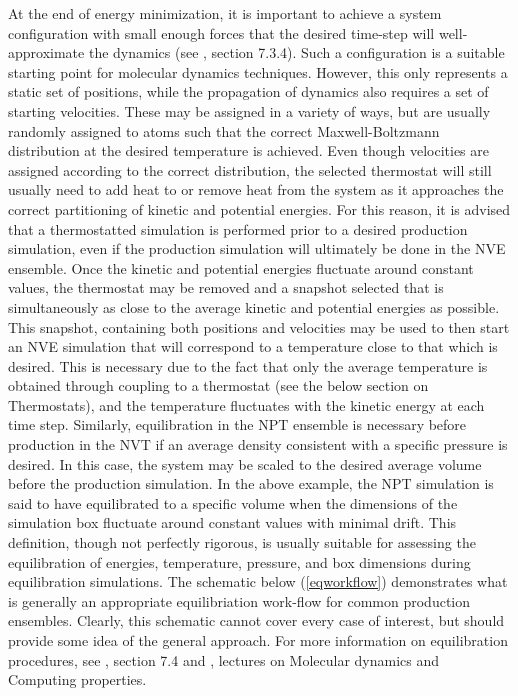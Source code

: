 \documentclass[9pt,bestpractices]{livecoms}
\begin{document}
At the end of energy minimization, it is important to achieve a system configuration with small enough forces that the desired time-step will well-approximate the dynamics (see \citet{LeachBook}, section 7.3.4).
Such a configuration is a suitable starting point for molecular dynamics techniques.
However, this only represents a static set of positions, while the propagation of dynamics also requires a set of starting velocities.
These may be assigned in a variety of ways, but are usually randomly assigned to atoms such that the correct Maxwell-Boltzmann distribution at the desired temperature is achieved.
Even though velocities are assigned according to the correct distribution, the selected thermostat will still usually need to add heat to or remove heat from the system as it approaches the correct partitioning of kinetic and potential energies.
For this reason, it is advised that a thermostatted simulation is performed prior to a desired production simulation, even if the production simulation will ultimately be done in the NVE ensemble.
Once the kinetic and potential energies fluctuate around constant values, the thermostat may be removed and a snapshot selected that is simultaneously as close to the average kinetic and potential energies as possible.
This snapshot, containing both positions and velocities may be used to then start an NVE simulation that will correspond to a temperature close to that which is desired.
This is necessary due to the fact that only the average temperature is obtained through coupling to a thermostat (see the below section on Thermostats), and the temperature fluctuates with the kinetic energy at each time step.
Similarly, equilibration in the NPT ensemble is necessary before production in the NVT if an average density consistent with a specific pressure is desired.
In this case, the system may be scaled to the desired average volume before the production simulation.
In the above example, the NPT simulation is said to have equilibrated to a specific volume when the dimensions of the simulation box fluctuate around constant values with minimal drift. 
This definition, though not perfectly rigorous, is usually suitable for assessing the equilibration of energies, temperature, pressure, and box dimensions during equilibration simulations.
The schematic below (\ref{eqworkflow}) demonstrates what is generally an appropriate equilibriation work-flow for common production ensembles.
Clearly, this schematic cannot cover every case of interest, but should provide some idea of the general approach.
For more information on equilibration procedures, see \citet{LeachBook}, section 7.4 and \citet{ShellNotes}, lectures on Molecular dynamics and Computing properties.
\end{document}
